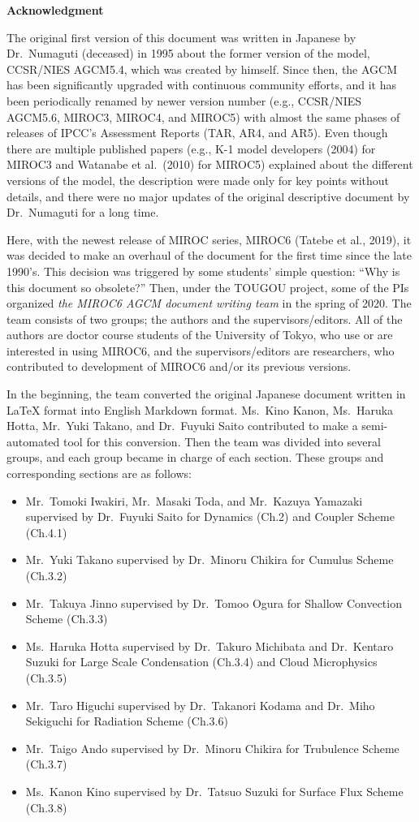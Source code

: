 \textbf{Acknowledgment}

The original first version of this document was written in Japanese by
Dr.~Numaguti (deceased) in 1995 about the former version of the model,
CCSR/NIES AGCM5.4, which was created by himself. Since then, the AGCM
has been significantly upgraded with continuous community efforts, and
it has been periodically renamed by newer version number (e.g.,
CCSR/NIES AGCM5.6, MIROC3, MIROC4, and MIROC5) with almost the same
phases of releases of IPCC's Assessment Reports (TAR, AR4, and AR5).
Even though there are multiple published papers (e.g., K-1 model
developers (2004) for MIROC3 and Watanabe et al.~(2010) for MIROC5)
explained about the different versions of the model, the description
were made only for key points without details, and there were no major
updates of the original descriptive document by Dr.~Numaguti for a long
time.

Here, with the newest release of MIROC series, MIROC6 (Tatebe et al.,
2019), it was decided to make an overhaul of the document for the first
time since the late 1990's. This decision was triggered by some
students' simple question: ``Why is this document so obsolete?'' Then,
under the TOUGOU project, some of the PIs organized \emph{the MIROC6
AGCM document writing team} in the spring of 2020. The team consists of
two groups; the authors and the supervisors/editors. All of the authors
are doctor course students of the University of Tokyo, who use or are
interested in using MIROC6, and the supervisors/editors are researchers,
who contributed to development of MIROC6 and/or its previous versions.

In the beginning, the team converted the original Japanese document
written in LaTeX format into English Markdown format. Ms.~Kino Kanon,
Ms.~Haruka Hotta, Mr.~Yuki Takano, and Dr.~Fuyuki Saito contributed to
make a semi-automated tool for this conversion. Then the team was
divided into several groups, and each group became in charge of each
section. These groups and corresponding sections are as follows:

\begin{itemize}
\item
  Mr.~Tomoki Iwakiri, Mr.~Masaki Toda, and Mr.~Kazuya Yamazaki
  supervised by Dr.~Fuyuki Saito for Dynamics (Ch.2) and Coupler Scheme
  (Ch.4.1)
\item
  Mr.~Yuki Takano supervised by Dr.~Minoru Chikira for Cumulus Scheme
  (Ch.3.2)
\item
  Mr.~Takuya Jinno supervised by Dr.~Tomoo Ogura for Shallow Convection
  Scheme (Ch.3.3)
\item
  Ms.~Haruka Hotta supervised by Dr.~Takuro Michibata and Dr.~Kentaro
  Suzuki for Large Scale Condensation (Ch.3.4) and Cloud Microphysics
  (Ch.3.5)
\item
  Mr.~Taro Higuchi supervised by Dr.~Takanori Kodama and Dr.~Miho
  Sekiguchi for Radiation Scheme (Ch.3.6)
\item
  Mr.~Taigo Ando supervised by Dr.~Minoru Chikira for Trubulence Scheme
  (Ch.3.7)
\item
  Ms.~Kanon Kino supervised by Dr.~Tatsuo Suzuki for Surface Flux Scheme
  (Ch.3.8)
\end{itemize}


